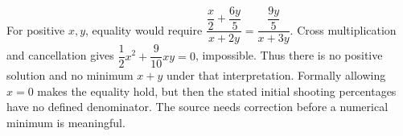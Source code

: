 For positive $x,y$, equality would require $\dfrac{\dfrac{x}{2}+\dfrac{6y}{5}}{x+2y}=\dfrac{\dfrac{9y}{5}}{x+3y}$. Cross multiplication and cancellation gives $\dfrac{1}{2}x^2+\dfrac{9}{10}xy=0$, impossible. Thus there is no positive solution and no minimum $x+y$ under that interpretation. Formally allowing $x=0$ makes the equality hold, but then the stated initial shooting percentages have no defined denominator. The source needs correction before a numerical minimum is meaningful.
